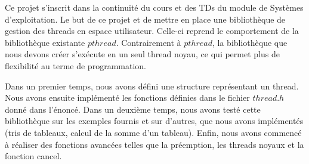 Ce projet s'inscrit dans la continuité du cours et des TDs du module de Systèmes d'exploitation. Le but de ce projet et de mettre en place une bibliothèque de gestion des threads en espace utilisateur. Celle-ci reprend le comportement de la bibliothèque existante $pthread$. Contrairement à $pthread$, la bibliothèque que nous devons créer s'exécute en un seul thread noyau, ce qui permet plus de flexibilité au terme de programmation.

Dans un premier temps, nous avons défini une structure représentant un thread. Nous avons ensuite implémenté les fonctions définies dans le fichier $thread.h$ donné dans l'énoncé. Dans un deuxième temps, nous avons testé cette bibliothèque sur les exemples fournis et sur d'autres, que nous avons implémentés (tris de tableaux, calcul de la somme d'un tableau). Enfin, nous avons commencé à réaliser des fonctions avancées telles que la préemption, les threads noyaux et la fonction cancel. 

